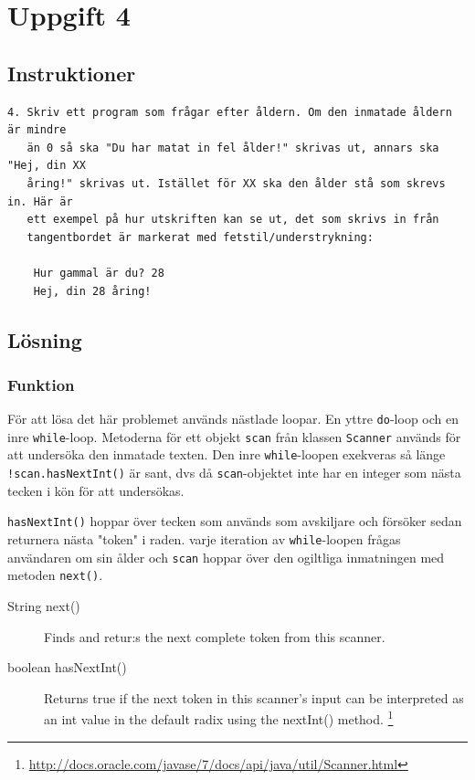 \section{Uppgift 4}\label{uppgift-4}

\subsection{Instruktioner}
\begin{verbatim}
4. Skriv ett program som frågar efter åldern. Om den inmatade åldern är mindre
   än 0 så ska "Du har matat in fel ålder!" skrivas ut, annars ska "Hej, din XX
   åring!" skrivas ut. Istället för XX ska den ålder stå som skrevs in. Här är
   ett exempel på hur utskriften kan se ut, det som skrivs in från
   tangentbordet är markerat med fetstil/understrykning:

    Hur gammal är du? 28
    Hej, din 28 åring!
\end{verbatim}

\subsection{Lösning}
\subsubsection{Funktion}
För att lösa det här problemet används nästlade loopar. En yttre
\texttt{do}-loop och en inre \texttt{while}-loop.
Metoderna för ett objekt \texttt{scan} från klassen \texttt{Scanner} används
för att undersöka den inmatade texten. Den inre \texttt{while}-loopen exekveras
så länge \texttt{!scan.hasNextInt()} är sant, dvs då \texttt{scan}-objektet inte
har en integer som nästa tecken i kön för att undersökas.
\par \texttt{hasNextInt()} hoppar över tecken som används som avskiljare och
försöker sedan returnera nästa "token" i raden.
 varje iteration av \texttt{while}-loopen frågas användaren om sin ålder och
\texttt{scan} hoppar över den ogiltliga inmatningen med metoden \texttt{next()}.

\begin{description}
    \item[String next()] Finds and retur:s the next complete token from this scanner.
    \item [boolean hasNextInt()] Returns true if the next token in this scanner's input can be interpreted as an int value in the default radix using the nextInt() method.
\footnote{\url{http://docs.oracle.com/javase/7/docs/api/java/util/Scanner.html}}
\end{description}

